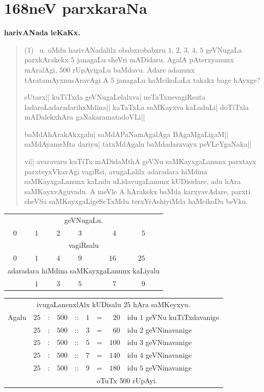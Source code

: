 \chapter{168neV parxkaraNa}

\begin{center}
{\large\bf harivANada leKaKx.}
\end{center}

\begin{verse}
{\rm(1)}~ u. oMdu harivANadalilx obabxrobabxru $1$, $2$, $3$, $4$, $5$
geVNugaLa parxkArakekx $5$ janagaLu sheVri mADidaru. AgalA
pAterxyanunx mAralAgi, $500$ rUpAyigaLu baMdavu. Adare adanunx
tAratamAyxnusAravAgi A $5$ janagaLu haMcikoLaLx takakx bage hAyxge?

sUtarx|| kuTiTxda geVNugaLelalxva| neTaTxnevagiRsuta
ladaroLadaradarihxMdina|| kaTaTxLa saMKayxva kaLaduLi| doTiTxla
mADalekxhAra gaNakaramatadoVLi|| 

baMdAhArakAkxgalu| saMdAPaNamAgalAga BAgaMgaLigaM|| saMdAyameMta
dariyu| tatxMdAgalu baMdadarxvayx peVLeYgaNaka||

vi|| avaravaru kuTiTx mADidaMthA geVNu saMKayxgaLanunx parxtayx
parxteyxVkavAgi vagiRsi, avugaLalilx adaradara hiMdina saMKayxgaLanunx
kaLadu uLidavugaLanunx kUDisidare, adu hAra saMKayxvAguvadu. A meVle A
hArakekx baMda karxyavAdare, parxti sheVSa saMKayxgaLigeSeTxMdu
terxYrAshiyiMda haMcikoDa beVku.
\end{verse}

\begin{center}
\begin{tabular}{ccccrrc}
\multicolumn{7}{c}{geVNugaLu.}\\[4pt]
$0$ & $1$ & $2$ & $3$ & $4$ & $5$\\[4pt]
\multicolumn{7}{c}{vagiRsalu}\\[4pt]
$0$ & $1$ & $4$ & $9$ & $16$ & $25$\\[4pt]
\multicolumn{7}{c}{adaradara hiMdina saMKayxgaLanunx kaLiyalu}\\[4pt]
& $1$ & $3$ & $5$ & $7$ & $9$
\end{tabular}
\end{center}

\begin{center}
\begin{tabular}{rccccccrl}
\multicolumn{9}{c}{ivugaLanenxlAlx kUDisalu $25$ hAra
saMKeyxyu.}\\[4pt]
Agalu & $25$ & : & $500$ & :: & $1$ & = & $20$ & idu $1$ geVNu
kuTiTxdavanige\\[3pt]
& $25$ & : & $500$ & :: & $3$ & = & $60$ & idu $2$ geVNinavanige\\[3pt]
& $25$ & : & $500$ & :: & $5$ & = & $100$ & idu $3$ geVNinavanige\\[3pt]
& $25$ & : & $500$ & :: & $7$ & = & $140$ & idu $4$ geVNinavanige\\[3pt]
& $25$ & : & $500$ & :: & $9$ & = & $180$ & idu $5$
geVNinavanige\\[3pt]
\cline{7-9}
&      &   &       &    &     & 
\multicolumn{3}{l}{oTuTx $500$ rUpAyi.}\\[3pt]
\cline{7-9}
\end{tabular}
\end{center}

\vskip 1cm
